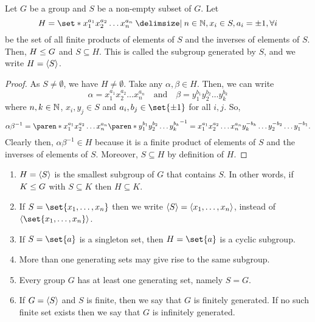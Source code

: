 \documentclass[11pt]{penrose}
\begin{document}
\begin{nthm}
    Let $G$ be a group and $S$ be a non-empty subset of $G$. Let
    \begin{equation*}
        H = \set*{ x_{1}^{a_{1}} x_{2}^{a_{2}} \dots x_{n}^{a_{n}} \st n \in \N, x_{i} \in S, a_{i} = \pm 1, \forall i}
    \end{equation*}
    be the set of all finite products of elements of $S$ and the inverses of elements of $S$. Then, $H \mathrel{\leq} G$ and $S \subseteq H$. This is called the subgroup generated by $S$, and we write $H = \langle S\rangle$.
\end{nthm}
\begin{proof}
    As $S \neq \emptyset$, we have $H \neq \emptyset$. Take any $\alpha, \beta \in H$. Then, we can write
    \begin{equation*}
        \alpha = x_{1}^{a_{1}} x_{2}^{a_{2}} \dots x_{n}^{a_{n}}
        \quad\text{and}\quad
        \beta = y_{1}^{b_{1}} y_{2}^{b_{2}} \dots y_{k}^{b_{k}}
    \end{equation*}
    where $n, k \in \mathbb{N}$, $x_{i}, y_{j} \in S$ and $a_{i}, b_{j} \in \set{\pm 1}$ for all $i, j$. So,
    \begin{equation*}
        \alpha \beta^{-1}
        = \paren*{ x_{1}^{a_{1}} x_{2}^{a_{2}} \dots x_{n}^{a_{n}} } \paren*{ y_{1}^{b_{1}} y_{2}^{b_{2}} \dots y_{k}^{b_{k}} }^{-1}
        = x_{1}^{a_{1}} x_{2}^{a_{2}} \dots x_{n}^{a_{n}} y_{k}^{-b_{k}} \dots y_{2}^{-b_{2}} \dots y_{1}^{-b_{1}}.
    \end{equation*}
    Clearly then, $\alpha\beta^{-1} \in H$ because it is a finite product of elements of $S$ and the inverses of elements of $S$. Moreover, $S \subseteq H$ by definition of $H$.
\end{proof}

\begin{remark}\phantom{}
    \begin{enumerate}
        \item $H = \langle S\rangle$ is the smallest subgroup of $G$ that contains $S$. In other words, if $K \mathrel{\leq} G$ with $S \subseteq K$ then $H \subseteq K$.
        \item If $S = \set{x_{1}, \dots, x_{n}}$ then we write $\langle S\rangle = \langle x_{1}, \dots, x_{n}\rangle$, instead of $\cyclic{\set{x_{1}, \dots, x_{n}}}$.
        \item If $S = \set{a}$ is a singleton set, then $H = \set{a}$ is a cyclic subgroup.
        \item More than one generating sets may give rise to the same subgroup.
        \item Every group $G$ has at least one generating set, namely $S = G$.
        \item If $G = \langle S\rangle$ and $S$ is finite, then we say that $G$ is finitely generated. If no such finite set exists then we say that $G$ is infinitely generated.
    \end{enumerate}
\end{remark}
\end{document}
